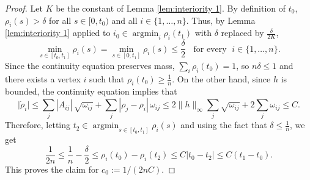 \documentclass[10pt]{article}
\numberwithin{equation}{section}
\begin{document}
\begin{proof}
Let $K$ be the constant of Lemma \ref{lem:interiority 1}. By definition of $t_0$, $\rho_i(s) > \delta$ for all $s\in[0,t_0)$ and all $i \in \{1,\ldots,n\}$. Thus, by Lemma \ref{lem:interiority 1} applied to $i_0\in\operatorname{argmin}_{i}\rho_i(t_1)$ with $\delta$ replaced by $\frac{\delta}{2K}$,
\begin{equation}
\min_{s\in[t_0,t_1]}\rho_i(s)=\min_{s\in[0,t_1]}\rho_i(s)\leq \frac{\delta}{2}\;\;\text{ for every }\; i\in \{1,\ldots,n\}. 
\end{equation}
Since the continuity equation preserves mass, $\sum_{i}\rho_i(t_0)=1$, so $n\delta\leq 1$ and there exists a vertex $i$ such that $\rho_i(t_0)\geq \frac{1}{n}$. On the other hand, since $h$ is bounded, the continuity equation implies that
\begin{equation}
\bigl|\dot{\rho}_i\bigr|
\le \sum_{j}|A_{ij}|\,\sqrt{\omega_{ij}}
    + \sum_{j}|\rho_j-\rho_i|\,\omega_{ij}
\le 2\|h\|_{\infty}\sum_{j}\sqrt{\omega_{ij}}
    + 2\sum_{j}\omega_{ij}
\le C.
\end{equation}
Therefore, letting $t_2\in \operatorname{argmin}_{s\in[t_0,t_1]}\rho_i(s)$ and using the fact that $\delta \leq \frac{1}{n}$, we get
\begin{equation}
  \frac{1}{2n}\leq\frac{1}{n}-\frac{\delta}{2}\leq  \rho_i(t_0)-\rho_i(t_2)\leq C|t_0-t_2|\leq C(t_1-t_0).  
\end{equation}
This proves the claim for $c_0:=1/(2nC)$.
\end{proof}
\end{document}
